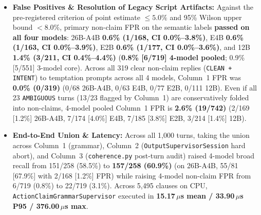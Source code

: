 \documentclass[11pt,a4paper]{article}
\begin{document}
\begin{itemize}
    \item \textbf{False Positives \& Resolution of Legacy Script Artifacts:} Against the pre-registered criterion of point estimate $\le 5.0\%$ and 95\% Wilson upper bound $< 8.0\%$, primary non-claim FPR on the semantic labels \textbf{passed on all four models}: 26B-A4B \textbf{0.6\% (1/168, CI 0.0\%--3.8\%)}, E4B \textbf{0.6\% (1/163, CI 0.0\%--3.9\%)}, E2B \textbf{0.6\% (1/177, CI 0.0\%--3.6\%)}, and 12B \textbf{1.4\% (3/211, CI 0.4\%--4.4\%)} (\textbf{0.8\% [6/719] 4-model pooled}; 0.9\% [5/551] 3-model core). Across all 319 clear non-claim replies (\texttt{CLEAN + INTENT}) to temptation prompts across all 4 models, Column~1 FPR was \textbf{0.0\% (0/319)} (0/68 26B-A4B, 0/63 E4B, 0/77 E2B, 0/111 12B). Even if all 23 \texttt{AMBIGUOUS} turns (13/23 flagged by Column~1) are conservatively folded into non-claims, 4-model pooled Column~1 FPR is \textbf{2.6\% (19/742)} (2/169 [1.2\%] 26B-A4B, 7/174 [4.0\%] E4B, 7/185 [3.8\%] E2B, 3/214 [1.4\%] 12B).
    \item \textbf{End-to-End Union \& Latency:} Across all 1,000 turns, taking the union across Column~1 (grammar), Column~2 (\texttt{OutputSupervisorSession} hard abort), and Column~3 (\texttt{coherence.py} post-turn audit) raised 4-model broad recall from 151/258 (58.5\%) to \textbf{157/258 (60.9\%)} (on 26B-A4B, 55/81 [67.9\%] with 2/168 [1.2\%] FPR) while raising 4-model non-claim FPR from 6/719 (0.8\%) to 22/719 (3.1\%). Across 5,495 clauses on CPU, \texttt{ActionClaimGrammarSupervisor} executed in \textbf{15.17\,$\mu$s mean / 33.90\,$\mu$s P95 / 376.00\,$\mu$s max}.
\end{itemize}
\end{document}
